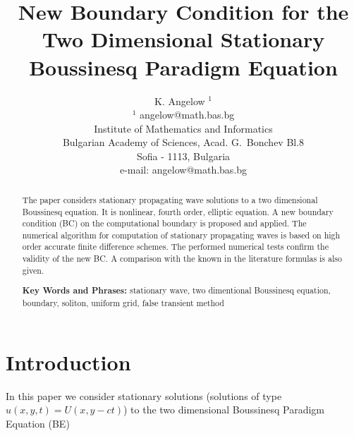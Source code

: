 \documentclass[12pt]{article}
\theoremstyle{theorem}
\theoremstyle{defi}
\begin{document}

\title{New Boundary Condition for the Two Dimensional Stationary Boussinesq Paradigm Equation}

\author{K. Angelow $^1$ \\[6pt]
$^1$ angelow@math.bas.bg\\ 
Institute of Mathematics and Informatics\\
Bulgarian Academy of Sciences, Acad. G.~Bonchev Bl.8\\
Sofia - 1113, Bulgaria\\
e-mail: angelow@math.bas.bg\\[6pt] }

\maketitle

\begin{abstract}

The paper considers stationary propagating wave solutions to a two dimensional Boussinesq equation. It is nonlinear, fourth order, elliptic equation. A new boundary condition (BC) on the computational boundary is proposed and applied. The numerical algorithm for computation of stationary propagating waves is based on high order accurate finite difference schemes. The performed numerical tests confirm the validity of the new BC. A comparison with the known in the literature formulas is also given.

\medskip


{\bf Key Words and Phrases:} stationary wave, two dimentional Boussinesq equation, boundary, soliton, uniform grid, false transient method

\end{abstract}

\section{Introduction}
In this paper we consider stationary solutions (solutions of type  $u(x,y,t)=U(x,y - ct)$) to the two dimensional Boussinesq Paradigm Equation (BE) 
\end{document}

